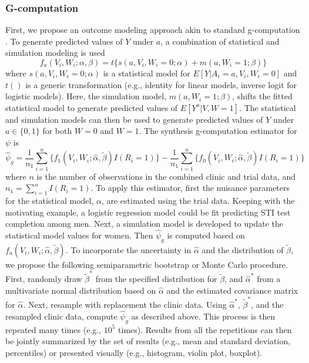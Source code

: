 \documentclass[]{article}
\begin{document}
\subsubsection*{G-computation}

First, we propose an outcome modeling approach akin to standard g-computation \cite{snowden_implementation_2011}. To generate predicted values of $Y$ under $a$, a combination of statistical and simulation modeling is used
\[f_a(V_i,W_i;\alpha,\beta) = t\{s(a,V_i,W_i=0;\alpha) + m(a, W_i=1;\beta)\}\]
where $s(a,V_i,W_i=0;\alpha)$ is a statistical model for $E[Y | A_i = a, V_i, W_i =0]$ and $t()$ is a generic transformation (e.g., identity for linear models, inverse logit for logistic models). Here, the simulation model, $m(a, W_i=1;\beta)$, shifts the fitted statistical model to generate predicted values of $E[Y^a | V, W=1]$. The statistical and simulation models can then be used to generate predicted values of $Y$ under $a\in\{0,1\}$ for both $W=0$ and $W=1$. The synthesis g-computation estimator for $\psi$ is 
\[\hat{\psi}_g = \frac{1}{n_1} \sum_{i=1}^{n} \{f_1(V_i,W_i;\hat{\alpha}, \tilde{\beta}) I(R_i = 1)\} - \frac{1}{n_1} \sum_{i=1}^{n} \{f_0(V_i,W_i;\hat{\alpha}, \tilde{\beta}) I(R_i = 1)\}\]
where $n$ is the number of observations in the combined clinic and trial data, and $n_1 = \sum_{i=1}^{n} I(R_i = 1)$. To apply this estimator, first the nuisance parameters for the statistical model, $\alpha$, are estimated using the trial data. Keeping with the motivating example, a logistic regression model could be fit predicting STI test completion among men. Next, a simulation model is developed to update the statistical model values for women. Then $\hat{\psi}_g$ is computed based on $f_a(V_i,W_i;\hat{\alpha}, \tilde{\beta})$. To incorporate the uncertainty in $\hat{\alpha}$ and the distribution of $\tilde{\beta}$, we propose the following semiparametric bootstrap or Monte Carlo procedure. First, randomly draw $\tilde{\beta}^*$ from the specified distribution for $\tilde{\beta}$, and $\hat{\alpha}^*$ from a multivariate normal distribution based on $\hat{\alpha}$ and the estimated covariance matrix for $\hat{\alpha}$. Next, resample with replacement the clinic data. Using $\hat{\alpha}^*$, $\tilde{\beta}^*$, and the resampled clinic data, compute $\hat{\psi}_g$ as described above. This process is then repeated many times (e.g., $10^5$ times). Results from all the repetitions can then be jointly summarized by the set of results (e.g., mean and standard deviation, percentiles) or presented visually (e.g., histogram, violin plot, boxplot).
\end{document}
